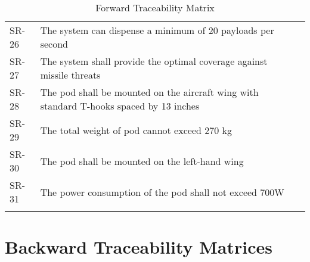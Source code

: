 \documentclass[Main]{subfiles}
\begin{document}
\begin{longtable}{p{} p{} p{}}
SR-26 & The system can dispense a minimum of 20 payloads per second &  \\

SR-27 & The system shall provide the optimal coverage against	missile threats &  \\

SR-28 & The pod shall be mounted on the aircraft wing with standard T-hooks spaced by 13 inches &  \\

SR-29 & The total weight of pod cannot exceed 270 kg  &  \\

SR-30 & The pod shall be mounted on the left-hand wing &  \\

SR-31 & The power consumption of the pod shall not exceed 700W &  \\\hline

\caption{Forward Traceability Matrix}
\label{Tab:Forward}
\end{longtable}





\newpage
\section{Backward Traceability Matrices}
\end{document}
